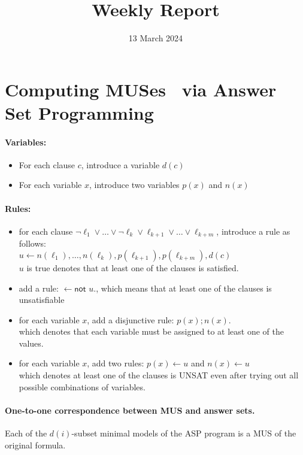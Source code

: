 \documentclass{article}
\title{Weekly Report}
\begin{document}
\date{13 March 2024}
\section{Computing MUSes~\cite{LPMM2016} via Answer Set Programming}
\paragraph{Variables:}
\begin{itemize}
    \item For each clause $c$, introduce a variable $d(c)$
    \item For each variable $x$, introduce two variables $p(x)$ and $n(x)$
\end{itemize}
\paragraph{Rules:}
\begin{itemize}
    \item for each clause $\neg{\ell_1} \vee \ldots \vee 
    \neg{\ell_k} \vee \ell_{k+1} \vee \ldots \vee \ell_{k+m}$, 
    introduce a rule as follows:\\
    $u \leftarrow n(\ell_1), \ldots, n(\ell_k), p(\ell_{k+1}), p(\ell_{k+m}), d(c)$\\
    $u$ is true denotes that at least one of the clauses is satisfied.
    \item add a rule: $\leftarrow \textsf{not } u.$,
    which means that at least one of the clauses is unsatisfiable
    \item for each variable $x$, add a disjunctive rule: $p(x) ; n(x).$\\
    which denotes that each variable must be assigned to at least one of the values.
    \item for each variable $x$, add two rules: $p(x) \leftarrow u$ and $n(x) \leftarrow u$\\
    which denotes at least one of the clauses is UNSAT even after trying out all possible combinations of variables.
\end{itemize}
\paragraph{One-to-one correspondence between MUS and answer sets.}
Each of the $d(i)$-subset minimal models of the ASP program is a MUS of the original formula. 


 

\end{document}

